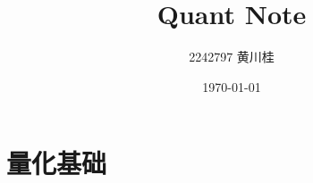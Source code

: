 \documentclass[12pt]{beamer}
\title{Quant Note}
\subtitle{}
\author[2242797 黄川桂]{2242797 黄川桂}
\institute{计算机科学与技术学院}
\date{\today}
\begin{document}
\maketitle

\section{量化基础}
% 
% 


\end{document}
